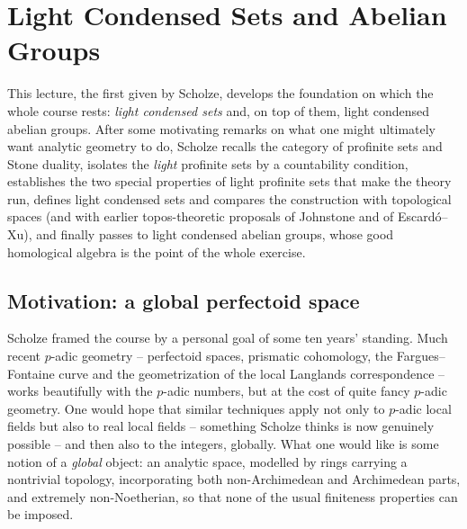 \section{Light Condensed Sets and Abelian Groups}
\label{lec:2}

This lecture, the first given by Scholze, develops the foundation on which the
whole course rests: \emph{light condensed sets} and, on top of them, light
condensed abelian groups. After some motivating remarks on what one might
ultimately want analytic geometry to do, Scholze recalls the category of
profinite sets and Stone duality, isolates the \emph{light} profinite sets by a
countability condition, establishes the two special properties of light
profinite sets that make the theory run, defines light condensed sets and
compares the construction with topological spaces (and with earlier
topos-theoretic proposals of Johnstone and of Escard\'o--Xu), and finally passes
to light condensed abelian groups, whose good homological algebra is the point
of the whole exercise.

\subsection{Motivation: a global perfectoid space}

Scholze framed the course by a personal goal of some ten years' standing. Much
recent $p$-adic geometry -- perfectoid spaces, prismatic cohomology, the
Fargues--Fontaine curve and the geometrization of the local Langlands
correspondence \cite{fargues2024geometrizationlocallanglandscorrespondence} --
works beautifully with the $p$-adic numbers, but at the cost of quite fancy
$p$-adic geometry. One would hope that similar techniques apply not only to
$p$-adic local fields but also to real local fields -- something Scholze thinks
is now genuinely possible -- and then also to the integers, globally. What one
would like is some notion of a \emph{global} object: an analytic space, modelled
by rings carrying a nontrivial topology, incorporating both non-Archimedean and
Archimedean parts, and extremely non-Noetherian, so that none of the usual
finiteness properties can be imposed.

